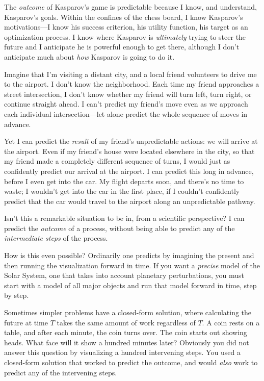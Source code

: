 {{
 The \textit{outcome} of Kasparov's game is
predictable because I know, and understand, Kasparov's
goals. Within the confines of the chess board, I know
Kasparov's motivations---I know his success criterion,
his utility function, his target as an optimization process. I know
where Kasparov is \textit{ultimately} trying to steer the future and I
anticipate he is powerful enough to get there, although I
don't anticipate much about \textit{how} Kasparov is
going to do it.}

{
 Imagine that I'm visiting a distant city, and a
local friend volunteers to drive me to the airport. I
don't know the neighborhood. Each time my friend
approaches a street intersection, I don't know whether
my friend will turn left, turn right, or continue straight ahead. I
can't predict my friend's move even as
we approach each individual intersection---let alone predict the whole
sequence of moves in advance.}

{
 Yet I can predict the \textit{result} of my
friend's unpredictable actions: we will arrive at the
airport. Even if my friend's house were located
elsewhere in the city, so that my friend made a completely different
sequence of turns, I would just as confidently predict our arrival at
the airport. I can predict this long in advance, before I even get into
the car. My flight departs soon, and there's no time to
waste; I wouldn't get into the car in the first place,
if I couldn't confidently predict that the car would
travel to the airport along an unpredictable pathway.}

{
 Isn't this a remarkable situation to be in, from a
scientific perspective? I can predict the \textit{outcome} of a
process, without being able to predict any of the \textit{intermediate
steps} of the process.}

{
 How is this even possible? Ordinarily one predicts by imagining
the present and then running the visualization forward in time. If you
want a \textit{precise} model of the Solar System, one that takes into
account planetary perturbations, you must start with a model of all
major objects and run that model forward in time, step by step.}

{
 Sometimes simpler problems have a closed-form solution, where
calculating the future at time $T$ takes the same amount of work
regardless of $T$\@. A coin rests on a table, and after each minute, the
coin turns over. The coin starts out showing heads. What face will it
show a hundred minutes later? Obviously you did not answer this
question by visualizing a hundred intervening steps. You used a
closed-form solution that worked to predict the outcome, and would
\textit{also} work to predict any of the intervening steps.}

}
